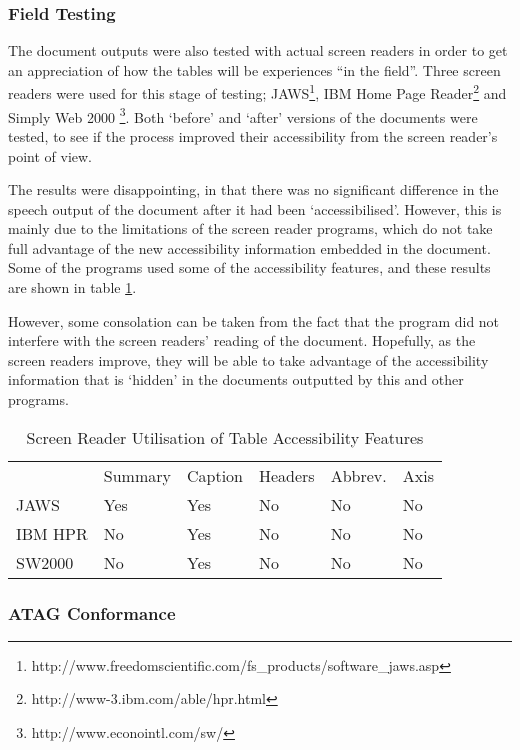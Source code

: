 \subsubsection{Field Testing}

The document outputs were also tested with actual screen readers in order to
get an appreciation of how the tables will be experiences ``in the field''.
Three screen readers were used for this stage of testing;
JAWS\footnote{http://www.freedomscientific.com/fs\_products/software\_jaws.asp},
IBM Home Page Reader\footnote{http://www-3.ibm.com/able/hpr.html} and Simply
Web 2000 \footnote{http://www.econointl.com/sw/}. Both `before' and `after'
versions of the documents were tested, to see if the process improved their
accessibility from the screen reader's point of view. 

The results were disappointing, in that there was no significant difference 
in the speech output of the document after it had been `accessibilised'. However,
this is mainly due to the limitations of the screen reader programs, which do
not take full advantage of the new accessibility information embedded in the 
document. Some of the programs used some of the accessibility features, and
these results are shown in table \ref{table:field-testing}.

However, some consolation can be taken from the fact that the program did not
interfere with the screen readers' reading of the document. Hopefully, as 
the screen readers improve, they will be able to take advantage of the
accessibility information that is `hidden' in the documents outputted by
this and other programs.

\begin{table}
\small
\begin{tabular}{lp{20mm}p{20mm}p{20mm}p{20mm}p{20mm}}
& Summary & Caption & Headers & Abbrev. & Axis \\
JAWS & Yes & Yes & No & No & No \\
IBM HPR & No & Yes & No & No & No \\
SW2000 & No & Yes & No & No & No \\
\end{tabular}
\caption{Screen Reader Utilisation of Table Accessibility Features}
\label{table:field-testing}
\normalsize
\end{table}

\subsubsection{ATAG Conformance}

